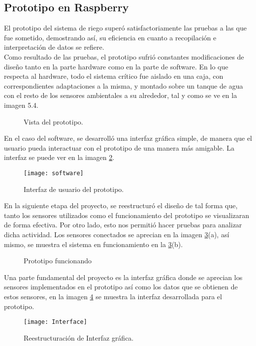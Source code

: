 \subsection{Prototipo en Raspberry}
El prototipo del sistema de riego super\'o satisfactoriamente las pruebas a las que fue sometido, demostrando as\'i, su eficiencia en cuanto a recopilaci\'on e interpretaci\'on de datos se refiere.\\ 
Como resultado de las pruebas, el prototipo sufri\'o constantes modificaciones de dise\~{n}o tanto en la parte hardware como en la parte de software. En lo que respecta al hardware, todo el sistema cr\'itico fue aislado en una caja, con correspondientes adaptaciones a la misma, y montado sobre un tanque de agua con el resto de los sensores ambientales a su alrededor, tal y como se ve en la imagen 5.4.%
\begin{figure}[H]
	\begin{center}
	\end{center}
	\label{hardwareda}
	\caption{Vista del prototipo.}
\end{figure} 
En el caso del software, se desarroll\'o una interfaz gr\'afica simple, de manera que el usuario pueda interactuar con el prototipo de una manera m\'as amigable. La interfaz se puede ver en la imagen \ref{software}.
\begin{figure}[H]
	\begin{center}
		\texttt{[image: software]}
	\end{center}
	\caption{Interfaz de usuario del prototipo.}
	\label{software}
\end{figure} 
En la siguiente etapa del proyecto, se reestructur\'o el dise\~no de tal forma que, tanto los sensores utilizados como el funcionamiento del prototipo se visualizaran de forma efectiva. Por otro lado, esto nos permiti\'o hacer pruebas para analizar dicha actividad. Los sensores conectados se aprecian en la imagen \ref{hardwarep}(a), as\'i mismo, se muestra el sistema en funcionamiento en la \ref{hardwarep}(b).
\begin{figure}[H]
	\begin{center}
	\end{center}
	\label{hardwarep}
	\caption{Prototipo funcionando}
\end{figure}
Una parte fundamental del proyecto es la interfaz gr\'afica donde se aprecian los sensores implementados en el prototipo as\'i como los datos que se obtienen de estos sensores, en la imagen \ref{interfaz} se muestra la interfaz desarrollada para el prototipo.
\begin{figure}[H]
	\begin{center}
		\texttt{[image: Interface]}
	\end{center}
	\caption{Reestructuraci\'on de Interfaz gr\'afica.}
	\label{interfaz}
\end{figure} 